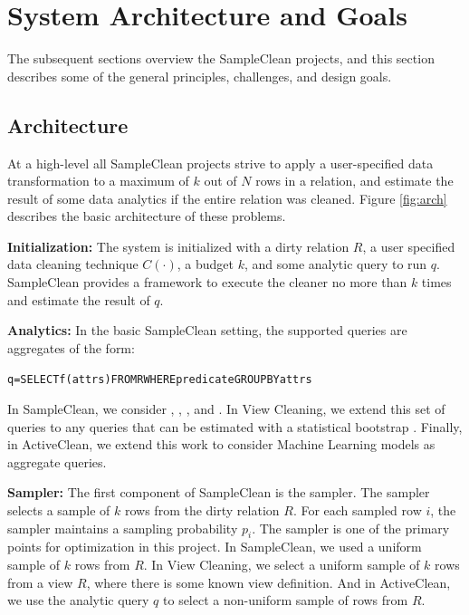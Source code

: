\section{System Architecture and Goals}
The subsequent sections overview the SampleClean projects, and this section describes some of the general principles, challenges, and design goals. 

\subsection{Architecture}
At a high-level all SampleClean projects strive to apply a user-specified data transformation to a maximum of $k$ out of $N$ rows in a relation, and estimate the result of some data analytics if the entire relation was cleaned. Figure \ref{fig:arch} describes the basic architecture of these problems. 

\vspace{0.5em}
\noindent\textbf{Initialization: } The system is initialized with a dirty relation $R$, a user specified data cleaning technique $C(\cdot)$, a budget $k$, and some analytic query to run $q$. SampleClean provides a framework to execute the cleaner no more than $k$ times and estimate the result of $q$.  

\vspace{0.5em}
\noindent\textbf{Analytics: } In the basic SampleClean setting, the supported queries are aggregates of the form:
\begin{alltt}
q = SELECT \textsf{f}(attrs) FROM R WHERE predicate GROUP BY attrs
\end{alltt}
In SampleClean, we consider \avgfunc, \sumfunc, \countfunc, and \varfunc.
In View Cleaning, we extend this set of queries to any queries that can be estimated with a statistical bootstrap \cite{agarwalknowing}.
Finally, in ActiveClean, we extend this work to consider Machine Learning models as aggregate queries.

\vspace{0.5em}
\noindent\textbf{Sampler: } The first component of SampleClean is the sampler. The sampler selects a sample of $k$ rows from the dirty relation $R$. For each sampled row $i$, the sampler maintains a sampling probability $p_i$. The sampler is one of the primary points for optimization in this project. In SampleClean, we used a uniform sample of $k$ rows from $R$.
In View Cleaning, we select a uniform sample of $k$ rows from a view $R$, where there is some known view definition.
And in ActiveClean, we use the analytic query $q$ to select a non-uniform sample of rows from $R$.

